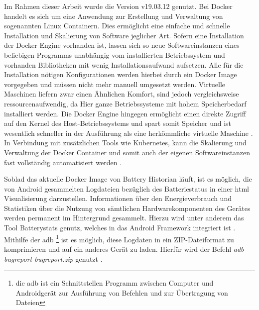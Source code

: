 Im Rahmen dieser Arbeit wurde die Version v19.03.12 genutzt. Bei Docker handelt es sich um eine Anwendung zur Erstellung und Verwaltung von sogenannten Linux Containern. Dies ermöglicht eine einfache und schnelle Installation und Skalierung von Software jeglicher Art. Sofern eine Installation der Docker Engine vorhanden ist, lassen sich so neue Softwareinstanzen eines beliebigen Programms unabhängig vom installierten Betriebssystem und vorhanden Bibliotheken mit wenig Installationsaufwand aufsetzen. Alle für die Installation nötigen Konfigurationen werden hierbei durch ein Docker Image vorgegeben und müssen nicht mehr manuell umgesetzt werden. Virtuelle Maschinen liefern zwar einen Ähnlichen Komfort, sind jedoch vergleichsweise ressourcenaufwendig, da Hier ganze Betriebssysteme mit hohem Speicherbedarf installiert werden. Die Docker Engine hingegen ermöglicht einen direkte Zugriff auf den Kernel des Host-Betriebssystems und spart somit Speicher und ist wesentlich schneller in der Ausführung als eine herkömmliche virtuelle Maschine \cite{Docker}.  In Verbindung mit zusätzlichen Tools wie Kubernetes, kann die Skalierung und Verwaltung der Docker Container und somit auch der eigenen Softwareinstanzen fast vollständig automatisiert werden \cite{Kubernetes}.

Soblad das aktuelle Docker Image von Battery Historian läuft, ist es möglich, die von Android gesammelten Logdateien bezüglich des Batteriestatus in einer \ac{html} Visualisierung darzustellen. Informationen über den Energieverbrauch und Statistiken über die Nutzung von sämtlichen Hardwarekomponenten des Gerätes werden permanent im Hintergrund gesammelt. Hierzu wird unter anderem das Tool Batterystats genutz, welches in das Android Framework integriert ist \cite{batteryhistorianandroid}. Mithilfe der \ac{adb} \footnote{die \ac{adb} ist ein Schnittstellen Programm zwischen Computer und Androidgerät zur Ausführung von Befehlen und zur Übertragung von Dateien} ist es möglich, diese Logdaten in ein ZIP-Dateiformat zu komprimieren und auf ein anderes Gerät zu laden. Hierfür wird der Befehl \emph{adb bugreport bugreport.zip} genutzt \cite{batteryhistorian}. 

